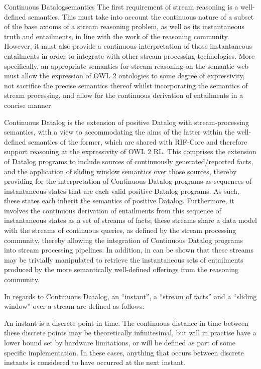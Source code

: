 \begin{nestedsection}{Continuous Datalog}{semantics}
	The first requirement of stream reasoning is a well-defined semantics.
	This must take into account the continuous nature of a subset of the base axioms of a stream reasoning problem, as well as its instantaneous truth and entailments, in line with the work of the reasoning community.
	However, it must also provide a continuous interpretation of those instantaneous entailments in order to integrate with other stream-processing technologies.
	More specifically, an appropriate semantics for stream reasoning on the semantic web must allow the expression of OWL 2 ontologies to some degree of expressivity, not sacrifice the precise semantics thereof whilst incorporating the semantics of stream processing, and allow for the continuous derivation of entailments in a concise manner.

	Continuous Datalog is the extension of positive Datalog with stream-processing semantics, with a view to accommodating the aims of the latter within the well-defined semantics of the former, which are shared with RIF-Core and therefore support reasoning at the expressivity of OWL 2 RL.
	This comprises the extension of Datalog programs to include sources of continuously generated/reported facts, and the application of sliding window semantics over those sources, thereby providing for the interpretation of Continuous Datalog programs as sequences of instantaneous states that are each valid positive Datalog programs.
	As such, these states each inherit the semantics of positive Datalog.
	Furthermore, it involves the continuous derivation of entailments from this sequence of instantaneous states as a set of streams of facts;
	these streams share a data model with the streams of continuous queries, as defined by the stream processing community, thereby allowing the integration of Continuous Datalog programs into stream processing pipelines.
	In addition, in can be shown that these streams may be trivially manipulated to retrieve the instantaneous sets of entailments produced by the more semantically well-defined offerings from the reasoning community.

	In regards to Continuous Datalog, an ``instant'', a ``stream of facts'' and a ``sliding window'' over a stream are defined as follows:

	\begin{definition}[Instant]\label{def:continuous datalog: instant}
		An instant is a discrete point in time.  The continuous distance in	time between these discrete points may be theoretically infinitesimal, but will in practise have a lower bound set by hardware limitations, or will be defined as part of some specific implementation.
		In these cases, anything that occurs between discrete instants is considered to have occurred at the next instant.
	\end{definition}


\end{nestedsection}
